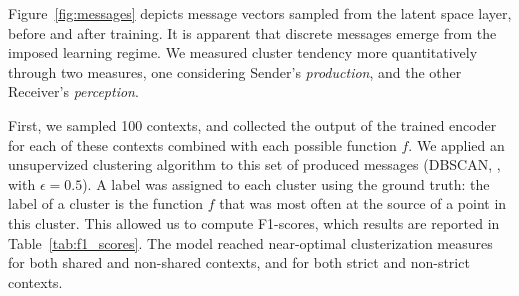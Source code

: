 \documentclass[11pt,a4paper]{article}
\begin{document}


Figure~\ref{fig:messages} depicts message vectors sampled from the latent space layer, before and after training. It is apparent that discrete messages emerge from the imposed learning regime. We measured cluster tendency more quantitatively through two measures, one considering Sender's \emph{production}, and the other Receiver's \emph{perception}. 

First, we sampled 100 contexts, and collected the output of the trained encoder for each of these contexts combined with each possible function $f$. We applied an unsupervized clustering algorithm to this set of produced messages (DBSCAN, \citealp{ester_density-based_1996}, with $\epsilon = 0.5$). A label was assigned to each cluster using the ground truth: the label of a cluster is the function $f$ that was most often at the source of a point in this cluster. This allowed us to compute F1-scores, which results are reported in Table~\ref{tab:f1_scores}.
The model reached near-optimal clusterization measures for both shared and non-shared contexts, and for both strict and non-strict contexts. 
\end{document}
